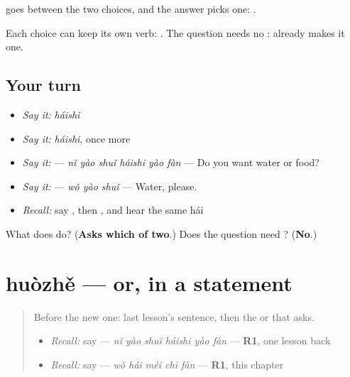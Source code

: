 \begin{grammarlens}[title={What you've built}]
 goes between the two choices, and the answer picks one: .

Each choice can keep its own verb: . The question needs no :  already makes it one.
\end{grammarlens}

\subsection*{Your turn}
\begin{itemize}
\raggedright
  \item \emph{Say it:} \emph{háishi}
  \item \emph{Say it:} \emph{háishi}, once more
  \item \emph{Say it:}  — \emph{nǐ yào shuǐ háishi yào fàn} — Do you want water or food?
  \item \emph{Say it:}  — \emph{wǒ yào shuǐ} — Water, please.
  \item \emph{Recall:} say , then , and hear the same hái
\end{itemize}

\begin{tcolorbox}[breakable,colback=teal!4,colframe=teal!35!black,title={Before you move on}]
What does  do? (\textbf{Asks which of two}.) Does the question need ? (\textbf{No}.)
\end{tcolorbox}
\section[huòzhě]{huòzhě — or, in a statement}

\label{lesson:ZH-C154-huozhe}



\begin{quote}
Before the new one: last lesson's sentence, then the or that asks.

\begin{itemize}
\raggedright
  \item \emph{Recall:} say  — \emph{nǐ yào shuǐ háishi yào fàn} — \textbf{R1}, one lesson back
  \item \emph{Recall:} say  — \emph{wǒ hái méi chī fàn} — \textbf{R1}, this chapter
\end{itemize}
\end{quote}

